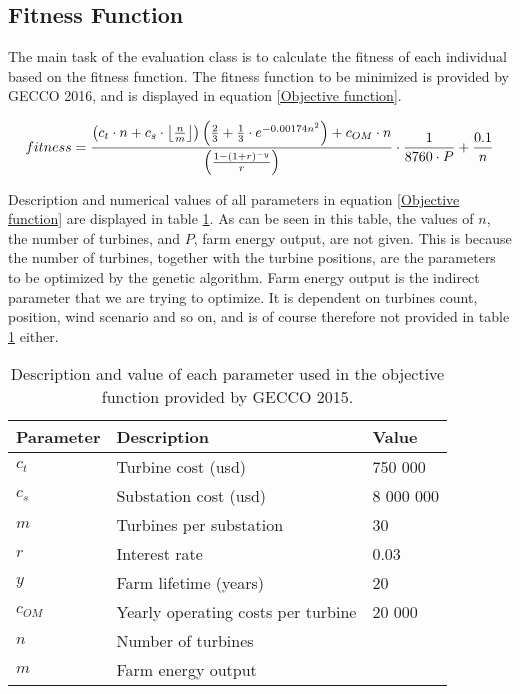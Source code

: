 \subsection{Fitness Function}\label{subsection:fitness function}
The main task of the evaluation class is to calculate the fitness of each individual based on the fitness function.  The fitness function to be minimized is provided by GECCO 2016, and is displayed in equation \ref{Objective function}.\\

\begin{small}
\begin{equation}
fitness =  \frac{ \left( c_t \cdot n + c_s \cdot \floor*{\frac{n}{m}} \right) \left( \frac{2}{3} + \frac{1}{3} \cdot e^{-0.00174n^2} \right) + c_{OM} \cdot n}{\left( \frac{1 - (1 + r)^{-y}}{r} \right) } \cdot \frac{1}{8760 \cdot P} + \frac{0.1}{n}
\label{Objective function} 
\end{equation}
\end{small}


\noindent Description and numerical values of all parameters in equation \ref{Objective function} are displayed in table \ref{Parameters}. As can be seen in this table, the values of $n$, the number of turbines, and $P$, farm energy output, are not given. This is because the number of turbines, together with the turbine positions, are the parameters to be optimized by the genetic algorithm. Farm energy output is the indirect parameter that we are trying to optimize. It is dependent on turbines count, position, wind scenario and so on, and is of course therefore not provided in table \ref{Parameters} either.\\


\begin{table}[h!]
\begin{center}
\caption{Description and value of each parameter used in the objective function provided by GECCO 2015.}
\label{Parameters}
\begin{tabular}{l|l|l}
\textbf{Parameter} & \textbf{Description} & \textbf{Value} \\ 
\hline 
$c_t$ & Turbine cost (usd) & 750 000 \\ 
$c_s$ & Substation cost (usd) & 8 000 000 \\ 
$m$ & Turbines per substation & 30 \\ 
$r$ & Interest rate & 0.03 \\ 
$y$ & Farm lifetime (years) & 20 \\ 
$c_{OM}$ & Yearly operating costs per turbine & 20 000 \\ 
$n$ & Number of turbines &  \\ 
$m$ & Farm energy output &  \\  
\end{tabular} 
\end{center}
\end{table}



